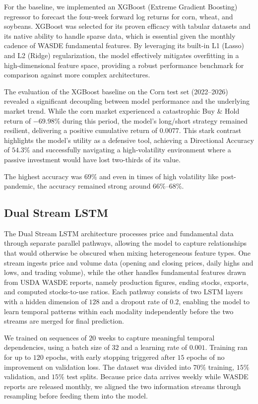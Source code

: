 \documentclass{article} %
\begin{document}
For the baseline, we implemented an XGBoost (Extreme Gradient Boosting) regressor to forecast the four-week forward log returns for corn, wheat, and soybeans. XGBoost was selected for its proven efficacy with tabular datasets and its native ability to handle sparse data, which is essential given the monthly cadence of WASDE fundamental features. By leveraging its built-in L1 (Lasso) and L2 (Ridge) regularization, the model effectively mitigates overfitting in a high-dimensional feature space, providing a robust performance benchmark for comparison against more complex architectures.

The evaluation of the XGBoost baseline on the Corn test set (2022--2026) revealed a significant decoupling between model performance and the underlying market trend. While the corn market experienced a catastrophic Buy \& Hold return of $-69.98\%$ during this period, the model's long/short strategy remained resilient, delivering a positive cumulative return of $0.0077$. This stark contrast highlights the model's utility as a defensive tool, achieving a Directional Accuracy of $54.3\%$ and successfully navigating a high-volatility environment where a passive investment would have lost two-thirds of its value.

The highest accuracy was $69\%$ and even in times of high volatility like post-pandemic, the accuracy remained strong around $66\%$--$68\%$.

\subsection{Dual Stream LSTM}

The Dual Stream LSTM architecture processes price and fundamental data through
separate parallel pathways, allowing the model to capture relationships that
would otherwise be obscured when mixing heterogeneous feature types. One stream
ingests price and volume data (opening and closing prices, daily highs and
lows, and trading volume), while the other handles fundamental features drawn
from USDA WASDE reports, namely production figures, ending stocks, exports, and
computed stocks-to-use ratios. Each pathway consists of two LSTM layers with a
hidden dimension of $128$ and a dropout rate of $0.2$, enabling the model to
learn temporal patterns within each modality independently before the two
streams are merged for final prediction.

We trained on sequences of $20$ weeks to capture meaningful temporal
dependencies, using a batch size of $32$ and a learning rate of $0.001$.
Training ran for up to $120$ epochs, with early stopping triggered after $15$
epochs of no improvement on validation loss. The dataset was divided into
$70\%$ training, $15\%$ validation, and $15\%$ test splits. Because price data
arrives weekly while WASDE reports are released monthly, we aligned the two information
streams through resampling before feeding them into the model.
\end{document}
